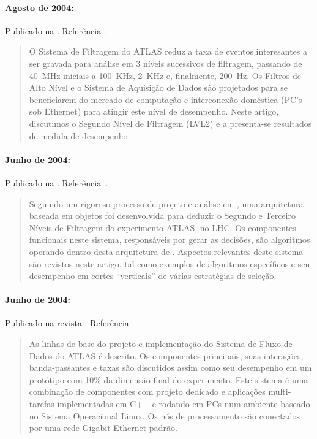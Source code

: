 \paragraph{Agosto de 2004: } Publicado na . Referência \cite{aa:tns-2004}.

\begin{quotation}
O Sistema de Filtragem do ATLAS reduz a taxa de eventos interesantes a ser
gravada para análise  em 3 níveis sucessivos de filtragem,
passando de 40~MHz iniciais a 100~KHz, 2~KHz e, finalmente, 200~Hz. Os Filtros
de Alto Nível e o Sistema de Aquisição de Dados são projetados para se
beneficiarem do mercado de computação e interconexão doméstica (PC's sob
Ethernet) para atingir este nível de desempenho. Neste artigo, discutimos o
Segundo Nível de Filtragem (LVL2) e a presenta-se resultados de medida de
desempenho.
\end{quotation}

\paragraph{Junho de 2004: } Publicado na . Referência~\cite{aa:tns-04-05}.

\begin{quotation}
Seguindo um rigoroso processo de projeto e análise em , uma
arquitetura baseada em objetos foi desenvolvida para deduzir o Segundo e
Terceiro Níveis de Filtragem do experimento ATLAS, no LHC. Os componentes
funcionais neste sistema, responsáveis por gerar as decisões, são algoritmos
operando dentro desta arquitetura de . Aspectos relevantes deste
sistema são revistos neste artigo, tal como exemplos de algoritmos específicos
e seu desempenho em cortes ``verticais'' de várias estratégias de seleção.
\end{quotation}

\paragraph{Junho de 2004: } Publicado na revista . Referência~\cite{aa:tns-2004-3}

\begin{quotation}
As linhas de base do projeto e implementação do Sistema de Fluxo de Dados do
ATLAS é descrito. Os componentes principais, suas interações, banda-passantes
e taxas são discutidos assim como seu desempenho em um protótipo com 10\% da
dimensão final do experimento. Este sistema é uma combinação de componentes
com projeto dedicado e aplicações multi-tarefas implementadas em C++ e rodando
em PCs num ambiente baseado no Sistema Operacional Linux. Os nós de
processamento são conectados por uma rede Gigabit-Ethernet padrão.
\end{quotation}

